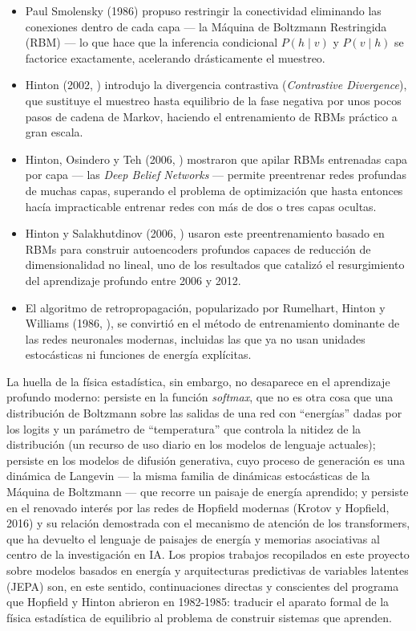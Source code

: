 \documentclass[12pt]{article}
\begin{document}
\begin{itemize}
\item Paul Smolensky (1986) propuso restringir la conectividad eliminando las conexiones dentro de cada capa --- la Máquina de Boltzmann Restringida (RBM) --- lo que hace que la inferencia condicional $P(h\mid v)$ y $P(v\mid h)$ se factorice exactamente, acelerando drásticamente el muestreo.
\item Hinton (2002, \cite{hinton2002}) introdujo la divergencia contrastiva (\emph{Contrastive Divergence}), que sustituye el muestreo hasta equilibrio de la fase negativa por unos pocos pasos de cadena de Markov, haciendo el entrenamiento de RBMs práctico a gran escala.
\item Hinton, Osindero y Teh (2006, \cite{hinton2006dbn}) mostraron que apilar RBMs entrenadas capa por capa --- las \emph{Deep Belief Networks} --- permite preentrenar redes profundas de muchas capas, superando el problema de optimización que hasta entonces hacía impracticable entrenar redes con más de dos o tres capas ocultas.
\item Hinton y Salakhutdinov (2006, \cite{hinton2006science}) usaron este preentrenamiento basado en RBMs para construir autoencoders profundos capaces de reducción de dimensionalidad no lineal, uno de los resultados que catalizó el resurgimiento del aprendizaje profundo entre 2006 y 2012.
\item El algoritmo de retropropagación, popularizado por Rumelhart, Hinton y Williams (1986, \cite{rumelhart1986}), se convirtió en el método de entrenamiento dominante de las redes neuronales modernas, incluidas las que ya no usan unidades estocásticas ni funciones de energía explícitas.
\end{itemize}

La huella de la física estadística, sin embargo, no desaparece en el aprendizaje profundo moderno: persiste en la función \emph{softmax}, que no es otra cosa que una distribución de Boltzmann sobre las salidas de una red con ``energías'' dadas por los logits y un parámetro de ``temperatura'' que controla la nitidez de la distribución (un recurso de uso diario en los modelos de lenguaje actuales); persiste en los modelos de difusión generativa, cuyo proceso de generación es una dinámica de Langevin --- la misma familia de dinámicas estocásticas de la Máquina de Boltzmann --- que recorre un paisaje de energía aprendido; y persiste en el renovado interés por las redes de Hopfield modernas (Krotov y Hopfield, 2016) y su relación demostrada con el mecanismo de atención de los transformers, que ha devuelto el lenguaje de paisajes de energía y memorias asociativas al centro de la investigación en IA. Los propios trabajos recopilados en este proyecto sobre modelos basados en energía y arquitecturas predictivas de variables latentes (JEPA) son, en este sentido, continuaciones directas y conscientes del programa que Hopfield y Hinton abrieron en 1982-1985: traducir el aparato formal de la física estadística de equilibrio al problema de construir sistemas que aprenden.
\end{document}

